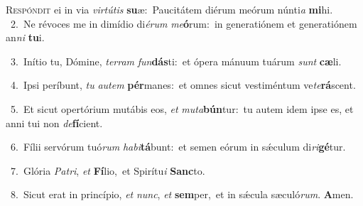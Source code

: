 \lettrine{\initial\textcolor{\initialcolor}{R}}{espóndit} ei in via \textit{vir}\-\textit{tú}\textit{tis} \textbf{su}\-æ:~\star Paucitátem diérum meórum núnti\textit{a} \textbf{mi}\-hi.\\
{\numbfont\textcolor{\numbcolor}{~2.}}~Ne révoces me in dimídio di\-\textit{é}\-\textit{rum} \textit{me}\-\textbf{ó}rum:~\star in generatiónem et generatiónem an\textit{ni} \textbf{tu}\-i.\par
{\numbfont\textcolor{\numbcolor}{~3.}}~Inítio tu, Dómine, \textit{ter}\-\textit{ram} \textit{fun}\-\textbf{dás}ti:~\star et ópera mánuum tuárum \textit{sunt} \textbf{cæ}\-li.\par
{\numbfont\textcolor{\numbcolor}{~4.}}~Ipsi períbunt, \textit{tu} \textit{au}\-\textit{tem} \textbf{pér}\-manes:~\star et omnes sicut vestiméntum ve\-\textit{te}\-\textbf{rá}scent.\par
{\numbfont\textcolor{\numbcolor}{~5.}}~Et sicut opertórium mutábis eos, \textit{et} \textit{mu}\-\textit{ta}\textbf{bún}tur:~\star tu autem idem ipse es, et anni tui non \textit{de}\-\textbf{fí}cient.\par
{\numbfont\textcolor{\numbcolor}{~6.}}~Fílii servórum tuó\textit{rum} \textit{ha}\-\textit{bi}\textbf{tá}bunt:~\star et semen eórum in sǽculum di\-\textit{ri}\-\textbf{gé}tur.\par
{\numbfont\textcolor{\numbcolor}{~7.}}~Glória \textit{Pa}\-\textit{tri}, \textit{et} \textbf{Fí}\-lio,~\star et Spirítu\textit{i} \textbf{Sanc}\-to.\par
{\numbfont\textcolor{\numbcolor}{~8.}}~Sicut erat in princípio, \textit{et} \textit{nunc}\-, \textit{et} \textbf{sem}\-per,~\star et in sǽcula sæculó\-\textit{rum}\-. \textbf{A}\-men.\par
